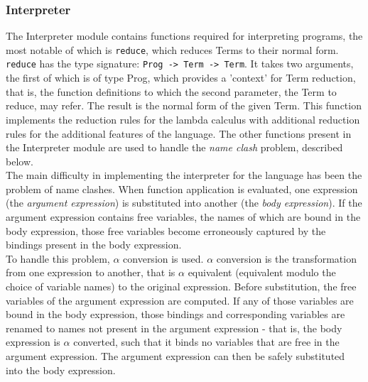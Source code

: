 \documentclass{article}
\begin{document}
\subsubsection{Interpreter}
The Interpreter module contains functions required for interpreting programs, the most notable of which is \texttt{reduce}, which reduces Terms to their normal form. \texttt{reduce} has the type signature: \texttt{Prog -> Term -> Term}. It takes two arguments, the first of which is of type Prog, which provides a 'context' for Term reduction, that is, the function definitions to which the second parameter, the Term to reduce, may refer. The result is the normal form of the given Term. This function implements the reduction rules for the lambda calculus with additional reduction rules for the additional features of the language. The other functions present in the Interpreter module are used to handle the \emph{name clash} problem, described below.
\\\indent The main difficulty in implementing the interpreter for the language has been the problem of name clashes. When function application is evaluated, one expression (the \emph{argument expression}) is substituted into another (the \emph{body expression}). If the argument expression contains free variables, the names of which are bound in the body expression, those free variables become erroneously captured by the bindings present in the body expression.
\\\indent To handle this problem, $\alpha$ conversion is used. $\alpha$ conversion is the transformation from one expression to another, that is $\alpha$ equivalent (equivalent modulo the choice of variable names) to the original expression. Before substitution, the free variables of the argument expression are computed. If any of those variables are bound in the body expression, those bindings and corresponding variables are renamed to names not present in the argument expression - that is, the body expression is $\alpha$ converted, such that it binds no variables that are free in the argument expression. The argument expression can then be safely substituted into the body expression.
\end{document}
